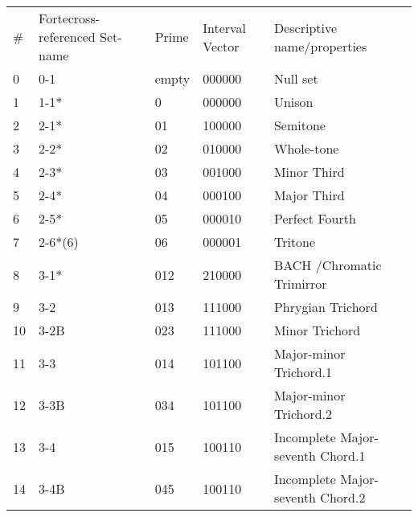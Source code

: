 \begin{table}[h]
\begin{tabular}{lllll}
\# & Fortecross-referenced Set-name & Prime & Interval Vector & Descriptive name/properties                       \\
0  & 0-1                            & empty & 000000          & Null set                                          \\
1  & 1-1*                           & 0     & 000000          & Unison                                            \\
2  & 2-1*                           & 01    & 100000          & Semitone                                          \\
3  & 2-2*                           & 02    & 010000          & Whole-tone                                        \\
4  & 2-3*                           & 03    & 001000          & Minor Third                                       \\
5  & 2-4*                           & 04    & 000100          & Major Third                                       \\
6  & 2-5*                           & 05    & 000010          & Perfect Fourth                                    \\
7  & 2-6*(6)                        & 06    & 000001          & Tritone                                           \\
8  & 3-1*                           & 012   & 210000          & BACH /Chromatic Trimirror                         \\
9  & 3-2                            & 013   & 111000          & Phrygian Trichord                                 \\
10 & 3-2B                           & 023   & 111000          & Minor Trichord                                    \\
11 & 3-3                            & 014   & 101100          & Major-minor Trichord.1                            \\
12 & 3-3B                           & 034   & 101100          & Major-minor Trichord.2                            \\
13 & 3-4                            & 015   & 100110          & Incomplete Major-seventh Chord.1                  \\
14 & 3-4B                           & 045   & 100110          & Incomplete Major-seventh Chord.2                  \\

\end{tabular}
\end{table}
